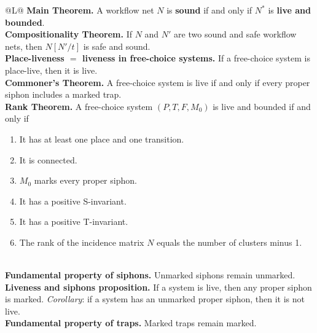 \begin{tabularx}{\linewidth}{@{}L@{}}
\midrule
\textbf{Main Theorem.} A workflow net $N$ is \textbf{sound} if and only if $N^*$ is \textbf{live and bounded}. \\
\midrule
\textbf{Compositionality Theorem.} If $N$ and $N'$ are two sound and safe workflow nets, then $N[N'/t]$ is safe and sound. \\
\midrule
\textbf{Place-liveness $=$ liveness in free-choice systems.} If a free-choice system is place-live, then it is live. \\
\midrule
\textbf{Commoner's Theorem.} A free-choice system is live if and only if every proper siphon includes a marked trap. \\
\midrule
\textbf{Rank Theorem.} A free-choice system $(P, T, F, M_0)$ is live and bounded if and only if \begin{enumerate}\item It has at least one place and one transition. \item It is connected. \item $M_0$ marks every proper siphon. \item It has a positive S-invariant. \item It has a positive T-invariant. \item The rank of the incidence matrix $N$ equals the number of clusters minus 1.\end{enumerate} \\
\midrule
\textbf{Fundamental property of siphons.} Unmarked siphons remain unmarked. \\
\midrule
\textbf{Liveness and siphons proposition.} If a system is live, then any proper siphon is marked. \emph{Corollary}: if a system has an unmarked proper siphon, then it is not live. \\
\midrule
\textbf{Fundamental property of traps.} Marked traps remain marked. \\
\bottomrule
\end{tabularx}

